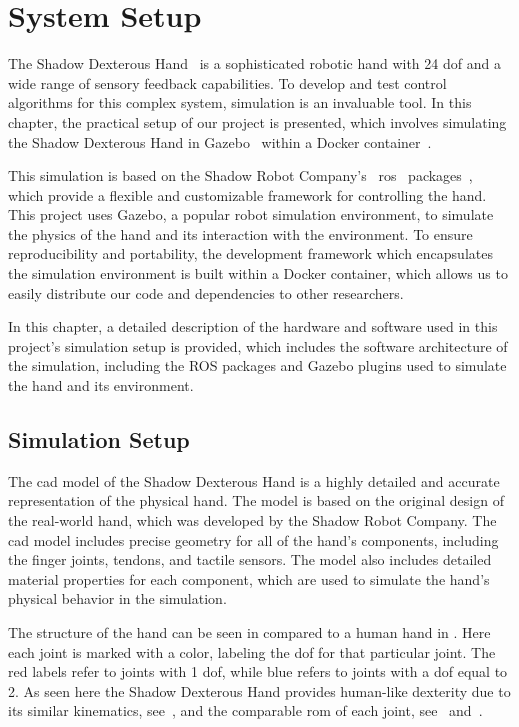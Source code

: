 \chapter{System Setup} \label{ch:system-setup}

The Shadow Dexterous Hand~\cite{shadow-dex-hand} is a sophisticated robotic hand with \num{24} \gls{dof} and a wide range of sensory feedback capabilities. To develop and test control algorithms for this complex system, simulation is an invaluable tool. In this chapter, the practical setup of our project is presented, which involves simulating the Shadow Dexterous Hand in Gazebo~\cite{gazebo} within a Docker container~\cite{docker}. \medskip

This simulation is based on the Shadow Robot Company's~\cite{shadow-robotics} \gls{ros}~\cite{ros} packages~\cite{shadow-ros-packages}, which provide a flexible and customizable framework for controlling the hand. This project uses Gazebo, a popular robot simulation environment, to simulate the physics of the hand and its interaction with the environment. To ensure reproducibility and portability, the development framework which encapsulates the simulation environment is built within a Docker container, which allows us to easily distribute our code and dependencies to other researchers. \medskip

In this chapter, a detailed description of the hardware and software used in this project's simulation setup is provided, which includes the software architecture of the simulation, including the ROS packages and Gazebo plugins used to simulate the hand and its environment.

\newpage

\section{Simulation Setup} \label{sec:system-setup-simulation-setup}

The \gls{cad} model of the Shadow Dexterous Hand is a highly detailed and accurate representation of the physical hand. The model is based on the original design of the real-world hand, which was developed by the Shadow Robot Company. The \gls{cad} model includes precise geometry for all of the hand's components, including the finger joints, tendons, and tactile sensors. The model also includes detailed material properties for each component, which are used to simulate the hand's physical behavior in the simulation.\medskip

The structure of the hand can be seen in  compared to a human hand in . Here each joint is marked with a color, labeling the \gls{dof} for that particular joint. The red labels refer to joints with \num{1} \gls{dof}, while blue refers to joints with a \gls{dof} equal to \num{2}. As seen here the Shadow Dexterous Hand provides human-like dexterity due to its similar kinematics, see~, and the comparable \gls{rom} of each joint, see~ and~.

